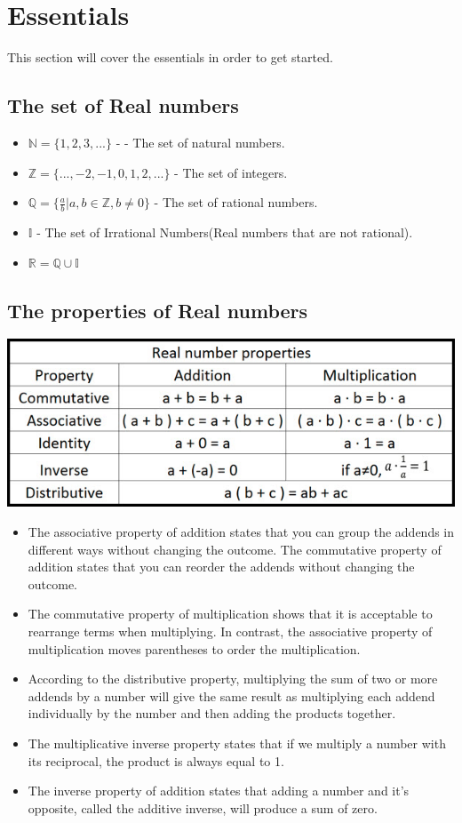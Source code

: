 \section{Essentials}
This section will cover the essentials in order to get started. 
\graphicspath{ {algebra-pre-calculus/essentials/} }
\subsection{The set of Real numbers}
\begin{itemize}
    \item $\mathbb{N} = \{1, 2, 3, ...\}$ - - The set of natural numbers. 
    \item $\mathbb{Z} = \{..., -2, -1, 0, 1, 2, ...\}$ - The set of integers.
    \item $\mathbb{Q} = \{\frac{a}{b} | a, b \in \mathbb{Z}, b \neq 0\}$ - The set of rational numbers. 
    \item $\mathbb{I}$ - The set of Irrational Numbers(Real numbers that are not rational). 
    \item $\mathbb{R} = \mathbb{Q} \cup \mathbb{I}$
\end{itemize}


\subsection{The properties of Real numbers}
\includegraphics{algebra-pre-calculus/essentials/sets2.jpg}
\begin{itemize}
    \item The associative property of addition states that you can group the addends in different ways without changing the outcome. The commutative property of addition states that you can reorder the addends without changing the outcome.
    \item The commutative property of multiplication shows that it is acceptable to rearrange terms when multiplying. In contrast, the associative property of multiplication moves parentheses to order the multiplication.
    \item According to the distributive property, multiplying the sum of two or more addends by a number will give the same result as multiplying each addend individually by the number and then adding the products together.
    \item The multiplicative inverse property states that if we multiply a number with its reciprocal, the product is always equal to 1.
    \item The inverse property of addition states that adding a number and it's opposite, called the additive inverse, will produce a sum of zero.
\end{itemize}
